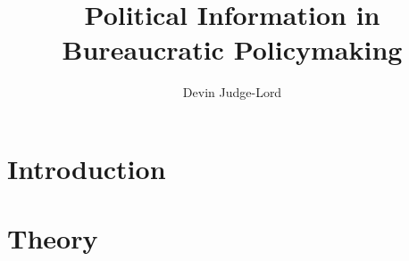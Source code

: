 \documentclass{article}
\title{Political Information in Bureaucratic Policymaking}
\author{Devin Judge-Lord} %
\begin{document}

\maketitle
\abstract{}
\tableofcontents

\newpage




\section{Introduction}



\section{Theory}








 

\end{document}
